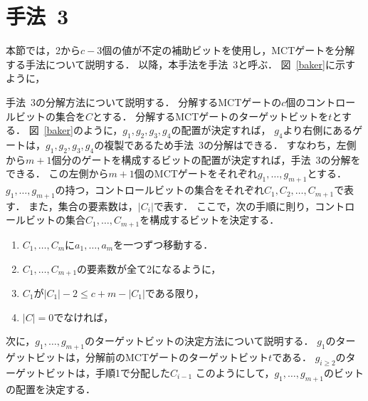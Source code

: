\section{手法~3}
本節では，2から$c-3$個の値が不定の補助ビットを使用し，MCTゲートを分解する手法\cite{baker2019decomposing}について説明する．
以降，本手法を手法~3と呼ぶ．
図~\ref{baker}に示すように，
\par
手法~3の分解方法について説明する．
分解するMCTゲートの$c$個のコントロールビットの集合を$C$とする．
分解するMCTゲートのターゲットビットを$t$とする．
図~\ref{baker}のように，$g_{1}, g_{2}, g_{3}, g_{4}$の配置が決定すれば，
$g_{4}$より右側にあるゲートは，$g_{1}, g_{2}, g_{3}, g_{4}$の複製であるため手法~3の分解はできる．
すなわち，左側から$m+1$個分のゲートを構成するビットの配置が決定すれば，手法~3の分解をできる．
この左側から$m+1$個のMCTゲートをそれぞれ$g_{1},\dots,g_{m+1}$とする．
$g_{1},\dots ,g_{m+1}$の持つ，コントロールビットの集合をそれぞれ$C_{1}, C_{2}, \dots ,C_{m+1}$で表す．
また，集合の要素数は，$|C_{i}|$で表す．
ここで，次の手順に則り，コントロールビットの集合$C_{1},\dots ,C_{m+1}$を構成するビットを決定する．
\begin{enumerate}[手順1]
  \item $C_{1}, \dots ,C_{m}$に$a_{1},\dots,a_{m}$を一つずつ移動する．
  \item $C_{1},\dots, C_{m+1}$の要素数が全て2になるように，
  \item $C_{1}$が$|C_{1}|-2 \leq c+m-|C_{1}|$である限り，
  \item $|C|=0$でなければ，
\end{enumerate}
\par
次に，$g_{1},\dots ,g_{m+1}$のターゲットビットの決定方法について説明する．
$g_{1}$のターゲットビットは，分解前のMCTゲートのターゲットビット$t$である．
$g_{i\geq 2}$のターゲットビットは，手順1で分配した$C_{i-1}$
このようにして，$g_{1},\dots, g_{m+1}$のビットの配置を決定する．
\par

